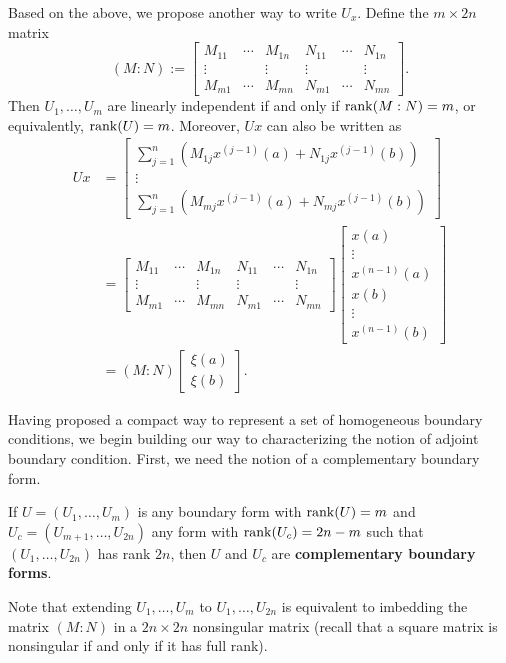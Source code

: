 \documentclass[11pt, oneside, a4paper]{article}
\begin{document}
Based on the above, we propose another way to write $U_x$. Define the $m\times 2n$ matrix
\[(M:N):=\begin{bmatrix}
    M_{11} & \cdots & M_{1n} & N_{11} & \cdots & N_{1n}\\
    \vdots &  & \vdots & \vdots & & \vdots\\
    M_{m1} & \cdots & M_{mn} & N_{m1} & \cdots & N_{mn}
\end{bmatrix}.\]
Then $U_1,\ldots,U_m$ are linearly independent if and only if $\operatorname{rank}(M:N)=m$, or equivalently, $\operatorname{rank}(U)=m$. 
Moreover, $Ux$ can also be written as
\begin{align*}
    Ux &= \begin{bmatrix}
        \sum_{j=1}^n (M_{1j}x^{(j-1)}(a) + N_{1j}x^{(j-1)}(b))\\
        \vdots\\
        \sum_{j=1}^n (M_{mj}x^{(j-1)}(a) + N_{mj}x^{(j-1)}(b))
    \end{bmatrix}\\
    &= \begin{bmatrix}
        M_{11} & \cdots & M_{1n} & N_{11} & \cdots & N_{1n}\\
        \vdots &  & \vdots & \vdots & & \vdots\\
        M_{m1} & \cdots & M_{mn} & N_{m1} & \cdots & N_{mn}
    \end{bmatrix} \begin{bmatrix}x(a)\\\vdots\\x^{(n-1)}(a)\\ x(b)\\\vdots\\x^{(n-1)}(b)\end{bmatrix}\\
    &= (M:N)\begin{bmatrix}
        \xi(a)\\
        \xi(b)
    \end{bmatrix}.
\end{align*}

Having proposed a compact way to represent a set of homogeneous boundary conditions, we begin building our way to characterizing the notion of adjoint boundary condition. First, we need the notion of a complementary boundary form.

\begin{defn}\label{defn:complementary boundary form}
    If $U=(U_1,\ldots, U_m)$ is any boundary form with $\operatorname{rank}(U)=m$ and $U_c=(U_{m+1},\ldots,U_{2n})$ any form with $\operatorname{rank}(U_c)=2n-m$ such that $(U_1,\ldots, U_{2n})$ has rank $2n$, then $U$ and $U_c$ are \textbf{complementary boundary forms}. 
    
    Note that extending $U_{1},\ldots, U_{m}$ to $U_1,\ldots,U_{2n}$ is equivalent to imbedding the matrix $(M:N)$ in a $2n\times 2n$ nonsingular matrix (recall that a square matrix is nonsingular if and only if it has full rank).
\end{defn}
\end{document}
